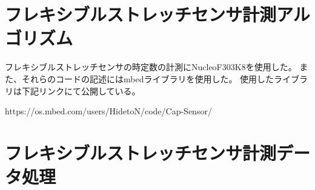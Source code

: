 \section{フレキシブルストレッチセンサ計測アルゴリズム}
フレキシブルストレッチセンサの時定数の計測にNucleoF303K8を使用した。
また、それらのコードの記述にはmbedライブラリを使用した。
使用したライブラリは下記リンクにて公開している。

https://os.mbed.com/users/HidetoN/code/Cap-Sensor/
\section{フレキシブルストレッチセンサ計測データ処理}
